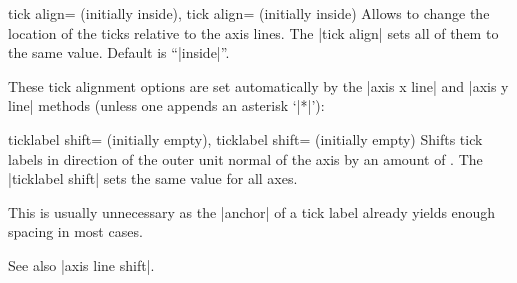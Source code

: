 \begin{pgfplotsxykeylist}{%
    \x tick align= (initially inside),
       tick align= (initially inside)%
}
    Allows to change the location of the ticks relative to the axis lines. The
    |tick align| sets all of them to the same value. Default is ``|inside|''.
\begin{codeexample}[]
\end{codeexample}

\begin{codeexample}[]
\end{codeexample}

    These tick alignment options are set automatically by the |axis x line| and
    |axis y line| methods (unless one appends an asterisk `|*|'):
\begin{codeexample}[]
\end{codeexample}
\end{pgfplotsxykeylist}

\begin{pgfplotsxykeylist}{%
    \x ticklabel shift= (initially empty),
       ticklabel shift= (initially empty)%
}
    Shifts tick labels in direction of the outer unit normal of the axis by an
    amount of . The |ticklabel shift| sets the same value for
    all axes.

    This is usually unnecessary as the |anchor| of a tick label already yields
    enough spacing in most cases.

    See also |axis line shift|.
\end{pgfplotsxykeylist}

